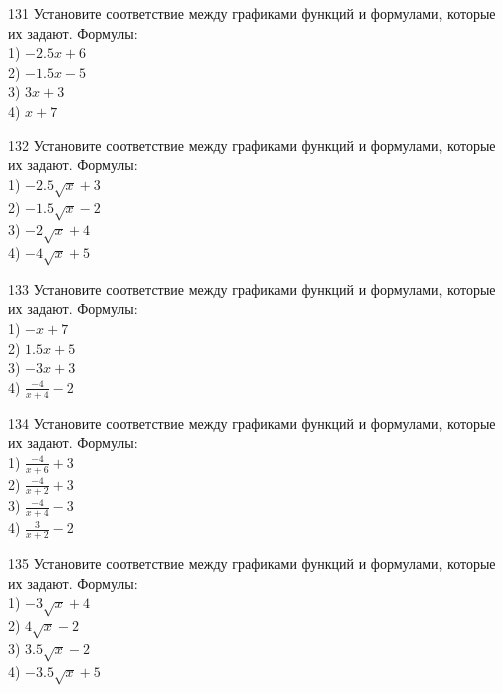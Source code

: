 \documentclass[4apaper]{article}
\begin{document}
\begin{taskBN}{131}
Установите соответствие между графиками функций и формулами, которые их задают. Формулы: \\1) $-2.5x+6$\\2) $-1.5x-5$\\3) $3x+3$\\4) $x+7$
\end{taskBN}

\begin{taskBN}{132}
Установите соответствие между графиками функций и формулами, которые их задают. Формулы: \\1) $-2.5\sqrt{x}+3$\\2) $-1.5\sqrt{x}-2$\\3) $-2\sqrt{x}+4$\\4) $-4\sqrt{x}+5$
\end{taskBN}

\begin{taskBN}{133}
Установите соответствие между графиками функций и формулами, которые их задают. Формулы: \\1) $-x+7$\\2) $1.5x+5$\\3) $-3x+3$\\4) $\frac{-4}{x+4}-2$
\end{taskBN}

\begin{taskBN}{134}
Установите соответствие между графиками функций и формулами, которые их задают. Формулы: \\1) $\frac{-4}{x+6}+3$\\2) $\frac{-4}{x+2}+3$\\3) $\frac{-4}{x+4}-3$\\4) $\frac{3}{x+2}-2$
\end{taskBN}

\begin{taskBN}{135}
Установите соответствие между графиками функций и формулами, которые их задают. Формулы: \\1) $-3\sqrt{x}+4$\\2) $4\sqrt{x}-2$\\3) $3.5\sqrt{x}-2$\\4) $-3.5\sqrt{x}+5$
\end{taskBN}
\end{document}
